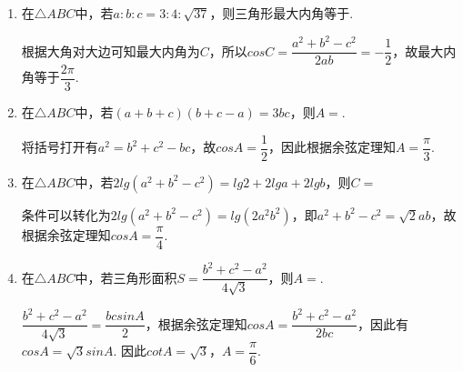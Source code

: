 \begin{enumerate}
\begin{enumerate}
\begin{jieda}
        \end{jieda}
        \item 在$\triangle ABC$中，若$a : b : c = 3 : 4:\sqrt{37}$，则三角形最大内角等于.
        \begin{jieda}
            根据大角对大边可知最大内角为$C$，所以$cosC = \dfrac{a^2+b^2-c^2}{2ab} = -\dfrac{1}{2}$，故最大内角等于$\dfrac{2\pi}{3}$.
        \end{jieda}
        \item 在$\triangle ABC$中，若$(a+b+c)(b+c-a) = 3bc$，则$A = $.
        \begin{jieda}
            将括号打开有$a^2 = b^2+c^2-bc$，故$cosA = \dfrac{1}{2}$，因此根据余弦定理知$A = \dfrac{\pi}{3}$.
        \end{jieda}
        \item 在$\triangle ABC$中，若$2lg(a^2+b^2-c^2) = lg2+2lga+2lgb$，则$C = $
        \begin{jieda}
            条件可以转化为$2lg(a^2+b^2-c^2) = lg(2a^2b^2)$，即$a^2+b^2-c^2 = \sqrt{2}ab$，故根据余弦定理知$cosA = \dfrac{\pi}{4}$.
        \end{jieda}
        \item 在$\triangle ABC$中，若三角形面积$S = \dfrac{b^2+c^2-a^2}{4\sqrt{3}}$，则$A = $.
        \begin{jieda}
            $\dfrac{b^2+c^2-a^2}{4\sqrt{3}} = \dfrac{bcsinA}{2}$，根据余弦定理知$cosA = \dfrac{b^2+c^2-a^2}{2bc}$，因此有$cosA = \sqrt{3}sinA$. 因此$cotA = \sqrt{3}$，$A = \dfrac{\pi}{6}$.
        \end{jieda}
    \end{enumerate}


\end{enumerate}
